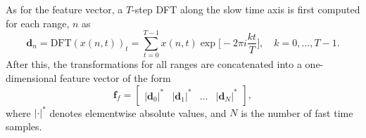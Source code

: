 




As for the feature vector, a $T$-step DFT along the slow time axis is first computed for each range, $n$ as
\begin{equation}
	\mathbf{d}_n=\text{DFT}(x(n,t))_t =  \sum_{t=0}^{T-1}x(n,t)\exp\Big[-2\pi i\frac{kt}{T}\Big], \quad k=0,...,T-1.
\end{equation}
After this, the transformations for all ranges are concatenated into a one-dimensional feature vector of the form
\begin{equation}
	\textbf{f}_{f}=\begin{bmatrix} |\mathbf{d}_0|^* & |\mathbf{d}_1|^* & \hdots & |\mathbf{d}_N|^* \end{bmatrix},
\end{equation}
where $|\cdot|^*$ denotes elementwise absolute values, and $N$ is the number of fast time samples.

